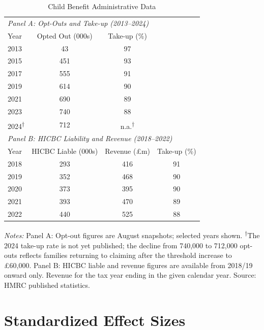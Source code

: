\documentclass[12pt]{article}
\begin{document}
\begin{table}[H]
\centering
\caption{Child Benefit Administrative Data}
\label{tab:admin}
\begin{threeparttable}
\begin{tabular}{lccc}
\toprule
\multicolumn{4}{l}{\emph{Panel A: Opt-Outs and Take-up (2013--2024)}} \\
Year & Opted Out (000s) & Take-up (\%) & \\
\midrule
2013 & 43 & 97 & \\
2015 & 451 & 93 & \\
2017 & 555 & 91 & \\
2019 & 614 & 90 & \\
2021 & 690 & 89 & \\
2023 & 740 & 88 & \\
2024\textsuperscript{$\dagger$} & 712 & n.a.\textsuperscript{$\dagger$} & \\[0.5em]
\multicolumn{4}{l}{\emph{Panel B: HICBC Liability and Revenue (2018--2022)}} \\
Year & HICBC Liable (000s) & Revenue (\pounds m) & Take-up (\%) \\
\midrule
2018 & 293 & 416 & 91 \\
2019 & 352 & 468 & 90 \\
2020 & 373 & 395 & 90 \\
2021 & 393 & 470 & 89 \\
2022 & 440 & 525 & 88 \\
\bottomrule
\end{tabular}
\begin{tablenotes}[flushleft]
\small
\item \emph{Notes:} Panel A: Opt-out figures are August snapshots; selected years shown. \textsuperscript{$\dagger$}The 2024 take-up rate is not yet published; the decline from 740,000 to 712,000 opt-outs reflects families returning to claiming after the threshold increase to \pounds60,000. Panel B: HICBC liable and revenue figures are available from 2018/19 onward only. Revenue for the tax year ending in the given calendar year. Source: HMRC published statistics.
\end{tablenotes}
\end{threeparttable}
\end{table}


\section{Standardized Effect Sizes}
\label{sec:sde}
\end{document}
